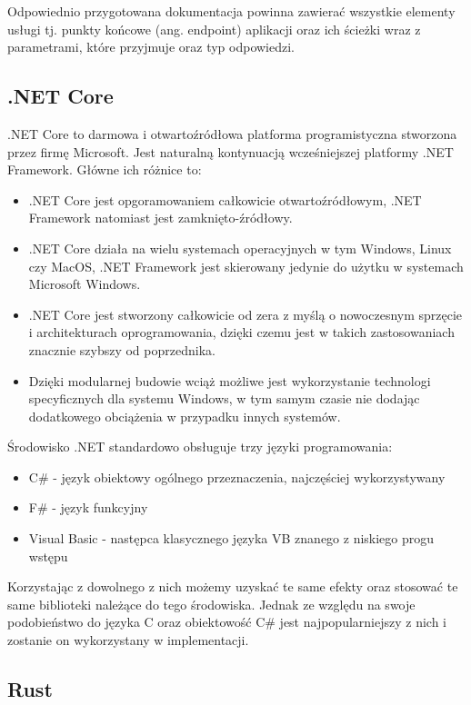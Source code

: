 \documentclass[12pt,a4paper]{article}
\begin{document}
Odpowiednio przygotowana dokumentacja powinna zawierać wszystkie elementy usługi tj.
punkty końcowe (ang. endpoint) aplikacji oraz ich ścieżki wraz z parametrami, które
przyjmuje oraz typ odpowiedzi.

\subsection{.NET Core}
.NET Core to darmowa i otwartoźródłowa platforma programistyczna stworzona przez firmę Microsoft. Jest naturalną 
kontynuacją wcześniejszej platformy .NET Framework. Główne ich różnice to:
\begin{itemize}
      \item .NET Core jest opgoramowaniem całkowicie otwartoźródłowym, .NET Framework natomiast jest zamknięto-źródłowy.
      \item .NET Core działa na wielu systemach operacyjnych w tym Windows, Linux czy MacOS, .NET Framework jest skierowany
            jedynie do użytku w systemach Microsoft Windows.
      \item .NET Core jest stworzony całkowicie od zera z myślą o nowoczesnym sprzęcie i architekturach oprogramowania,
            dzięki czemu jest w takich zastosowaniach znacznie szybszy od poprzednika.
      \item Dzięki modularnej budowie wciąż możliwe jest wykorzystanie technologi specyficznych dla
            systemu Windows, w tym samym czasie nie dodając dodatkowego obciążenia w przypadku
            innych systemów.
\end{itemize}

Środowisko .NET standardowo obsługuje trzy języki programowania:
\begin{itemize}
      \item C\# - język obiektowy ogólnego przeznaczenia, najczęściej wykorzystywany
      \item F\# - język funkcyjny
      \item Visual Basic - następca klasycznego języka VB znanego z niskiego progu wstępu
\end{itemize}
Korzystając z dowolnego z nich możemy uzyskać te same efekty oraz stosować te
same biblioteki należące do tego środowiska. Jednak ze względu na swoje podobieństwo
do języka C oraz obiektowość C\# jest najpopularniejszy z nich i zostanie on wykorzystany
w implementacji.

\subsection{Rust}
\end{document}
